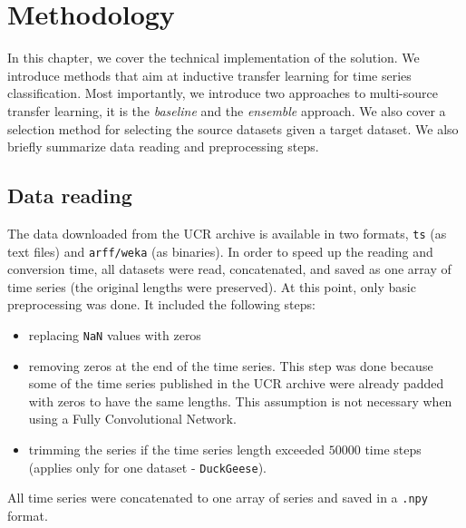 \documentclass[a4paper,11pt,twoside]{report}
\theoremstyle{definition}
\begin{document}
\chapter{Methodology}
In this chapter, we cover the technical implementation of the solution. We introduce methods that aim at inductive transfer learning for time series classification. Most importantly, we introduce two approaches to multi-source transfer learning, it is the \textit{baseline} and the \textit{ensemble} approach. We also cover a selection method for selecting the source datasets given a target dataset. We also briefly summarize data reading and preprocessing steps.

\section{Data reading}\label{section:reading}
The data downloaded from the UCR archive is available in two formats, \texttt{ts} (as text files) and \texttt{arff/weka} (as binaries). In order to speed up the reading and conversion time, all datasets were read, concatenated, and saved as one array of time series (the original lengths were preserved). At this point, only basic preprocessing was done. It included the following steps:
\begin{itemize}
\item replacing \texttt{NaN} values with zeros
\item removing zeros at the end of the time series. This step was done because some of the time series published in the UCR archive were already padded with zeros to have the same lengths. This assumption is not necessary when using a Fully Convolutional Network.
\item trimming the series if the time series length exceeded $50 000$ time steps (applies only for one dataset - \texttt{DuckGeese}).


\end{itemize}

All time series were concatenated to one array of series and saved in a \texttt{.npy} format.
\end{document}
